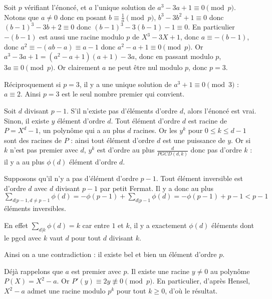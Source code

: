 \begin{sol}
Soit $p$ vérifiant l'énoncé, et $a$ l'unique solution de $a^3 - 3a + 1\equiv 0 \pmod{p}$. Notons que $a\neq 0$ donc en posant $b\equiv \frac{1}{a}\pmod{p}$, $b^3 - 3b^2 + 1\equiv 0$ donc $(b - 1)^3 - 3b + 2\equiv 0$ donc $(b - 1)^3 - 3(b - 1) - 1\equiv 0$. En particulier $-(b - 1)$ est aussi une racine modulo $p$ de $X^3 - 3X + 1$, donc $a\equiv -(b - 1)$, donc $a^2\equiv -(ab - a)\equiv a - 1$ donc $a^2 - a + 1\equiv 0 \pmod{p}$. Or $a^3-3a + 1=(a^2 - a + 1)(a + 1) - 3a$, donc en passant modulo $p$, $3a\equiv 0\pmod{p}$. Or clairement $a$ ne peut être nul modulo $p$, donc $p=3$.


Réciproquement si $p=3$, il y a une unique solution de $a^3 + 1\equiv 0\pmod{3}$ : $a\equiv 2$. Ainsi $p=3$ est le seul nombre premier qui convient.
\end{sol}


\begin{sol}
Soit $d$ divisant $p - 1$. S'il n'existe pas d'éléments d'ordre $d$, alors l'énoncé est vrai. Sinon, il existe $y$ élément d'ordre $d$. Tout élément d'ordre $d$ est racine de $P=X^d - 1$, un polynôme qui a au plus $d$ racines. Or les $y^k$ pour $0\leq k\leq d - 1$ sont des racines de $P$ : ainsi tout élément d'ordre $d$ est une puissance de $y$. Or si $k$ n'est pas premier avec $d$, $y^k$ est d'ordre au plus $\frac{d}{PGCD(d,k)}$ donc pas d'ordre $k$ : il y a au plus $\phi(d)$ élément d'ordre $d$.


Supposons qu'il n'y a pas d'élément d'ordre $p - 1$. Tout élément inversible est d'ordre $d$ avec $d$ divisant $p - 1$ par petit Fermat. Il y a donc au plus $\sum\limits_{d|p - 1, d\neq p - 1}\phi(d)=-\phi(p - 1) + \sum\limits_{d|p - 1}\phi(d)=-\phi(p - 1) + p - 1<p - 1$ éléments inversibles.

En effet $\sum_{d|k}\phi(d)=k$ car entre $1$ et $k$, il y a exactement $\phi(d)$ éléments dont le pgcd avec $k$ vaut $d$ pour tout $d$ divisant $k$.

Ainsi on a une contradiction : il existe bel et bien un élément d'ordre $p$.
\end{sol}

\begin{sol}
Déjà rappelons que $a$ est premier avec $p$. Il existe une racine $y\neq 0$ au polynôme $P(X)=X^2 - a$. Or $P'(y)\equiv 2y\not\equiv 0 \pmod{p}$. En particulier, d'après Hensel, $X^2 - a$ admet une racine modulo $p^k$ pour tout $k\geq 0$, d'où le résultat.
\end{sol}
